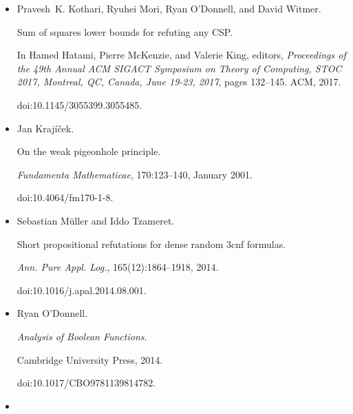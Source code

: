 \documentclass[10pt,a4paper]{article}
\begin{document}
\begin{itemize}
In Bojan Mohar, Igor Shinkar, and Ryan O’Donnell, editors, \emph{Proceedings of the 56th Annual ACM Symposium on Theory of Computing, STOC
2024, Vancouver, BC, Canada, June 24-28, 2024}, pages 776–787. ACM, 2024.


doi:10.1145/3618260.3649640.





\item[] 
[27]

Pravesh K. Kothari, Ryuhei Mori, Ryan O’Donnell, and David Witmer.


Sum of squares lower bounds for refuting any CSP.


In Hamed Hatami, Pierre McKenzie, and Valerie King, editors, \emph{Proceedings of the 49th Annual ACM SIGACT Symposium on Theory of
Computing, STOC 2017, Montreal, QC, Canada, June 19-23, 2017}, pages
132–145. ACM, 2017.


doi:10.1145/3055399.3055485.





\item[] 
[28]

Jan Krajíček.


On the weak pigeonhole principle.


\emph{Fundamenta Mathematicae}, 170:123–140, January 2001.


doi:10.4064/fm170-1-8.





\item[] 
[29]

Sebastian Müller and Iddo Tzameret.


Short propositional refutations for dense random 3cnf formulas.


\emph{Ann. Pure Appl. Log.}, 165(12):1864–1918, 2014.


doi:10.1016/j.apal.2014.08.001.





\item[] 
[30]

Ryan O’Donnell.


\emph{Analysis of Boolean Functions}.


Cambridge University Press, 2014.


doi:10.1017/CBO9781139814782.





\item[] 
[31]


\end{itemize}
\end{document}
